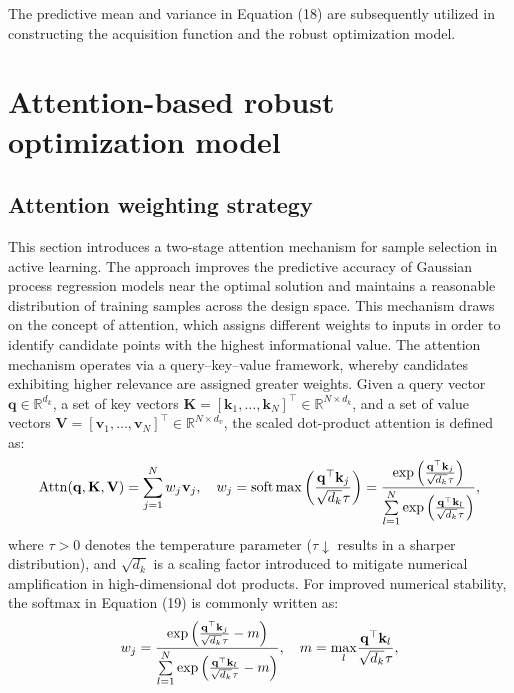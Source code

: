 \documentclass[]{interact}
\theoremstyle{plain}%
\theoremstyle{definition}
\theoremstyle{remark}
\begin{document}
The predictive mean and variance in Equation (18) are subsequently utilized in constructing the acquisition function and the robust optimization model.

\section{Attention-based robust optimization model}
\subsection{Attention weighting strategy}
This section introduces a two-stage attention mechanism for sample selection in active learning. The approach improves the predictive accuracy of Gaussian process regression models near the optimal solution and maintains a reasonable distribution of training samples across the design space. This mechanism draws on the concept of attention, which assigns different weights to inputs in order to identify candidate points with the highest informational value. The attention mechanism operates via a query--key--value framework, whereby candidates exhibiting higher relevance are assigned greater weights. Given a query vector $\mathbf{q} \in \mathbb{R}^{d_k}$, a set of key vectors $\mathbf{K} = [\mathbf{k}_1, \ldots, \mathbf{k}_N]^\top \in \mathbb{R}^{N \times d_k}$, and a set of value vectors $\mathbf{V}=[\mathbf{v}_1,\ldots,\mathbf{v}_N]^\top\in\mathbb{R}^{N\times d_v}$, the scaled dot-product attention is defined as:
\begin{equation}
	{\rm{Attn}}({\bf{q}},{\bf{K}},{\bf{V}}) = \sum\limits_{j = 1}^N {{w_j}} {\mkern 1mu} {{\bf{v}}_j},\quad {w_j} = {\rm{soft}}\max \left( {\frac{{{{\bf{q}}^ \top }{{\bf{k}}_j}}}{{\sqrt {{d_k}} {\mkern 1mu} \tau }}} \right) = \frac{{\exp \left( {\frac{{{{\bf{q}}^ \top }{{\bf{k}}_j}}}{{\sqrt {{d_k}} {\mkern 1mu} \tau }}} \right)}}{{\sum\limits_{l = 1}^N {\exp } \left( {\frac{{{{\bf{q}}^ \top }{{\bf{k}}_l}}}{{\sqrt {{d_k}} {\mkern 1mu} \tau }}} \right)}},
\end{equation}
where $\tau > 0$ denotes the temperature parameter ($\tau \downarrow$ results in a sharper distribution), and $\sqrt{d_{k}}$ is a scaling factor introduced to mitigate numerical amplification in high-dimensional dot products. For improved numerical stability, the softmax in Equation (19) is commonly written as: 
\begin{equation}
	{w_j} = \frac{{\exp \left( {\frac{{{{\bf{q}}^ \top }{{\bf{k}}_j}}}{{\sqrt {{d_k}} {\mkern 1mu} \tau }} - m} \right)}}{{\sum\limits_{l = 1}^N {\exp } \left( {\frac{{{{\bf{q}}^ \top }{{\bf{k}}_l}}}{{\sqrt {{d_k}} {\mkern 1mu} \tau }} - m} \right)}},\quad m = {\max _l}\frac{{{{\bf{q}}^ \top }{{\bf{k}}_l}}}{{\sqrt {{d_k}} {\mkern 1mu} \tau }},
\end{equation}
\end{document}
